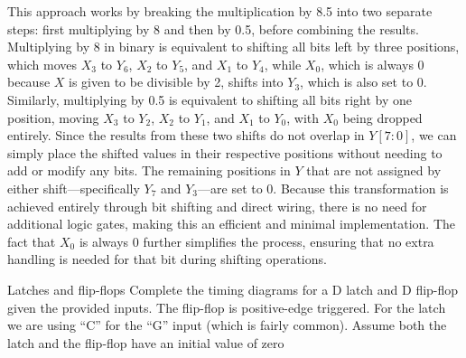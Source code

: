 \documentclass[12pt, letterpaper]{article}
\begin{document}
This approach works by breaking the multiplication by 8.5 into two separate steps: first multiplying by 8 and then by 0.5, before combining the results. 
Multiplying by 8 in binary is equivalent to shifting all bits left by three positions, which moves \( X_3 \) to \( Y_6 \), \( X_2 \) to \( Y_5 \), and \( X_1 \) to \( Y_4 \), while \( X_0 \), which is always 0 because \( X \) is given to be divisible by 2, shifts into \( Y_3 \), which is also set to 0. Similarly, multiplying by 0.5 is equivalent to shifting all bits right by one position, moving \( X_3 \) to \( Y_2 \), \( X_2 \) to \( Y_1 \), and \( X_1 \) to \( Y_0 \), with \( X_0 \) being dropped entirely. 
Since the results from these two shifts do not overlap in \( Y[7:0] \), we can simply place the shifted values in their respective positions without needing to add or modify any bits. 
The remaining positions in \( Y \) that are not assigned by either shift—specifically \( Y_7 \) and \( Y_3 \)—are set to 0. 
Because this transformation is achieved entirely through bit shifting and direct wiring, there is no need for additional logic gates, making this an efficient and minimal implementation. 
The fact that \( X_0 \) is always 0 further simplifies the process, ensuring that no extra handling is needed for that bit during shifting operations.

\begin{problem}{Latches and flip-flops}
    Complete the timing diagrams for a D latch and D flip-flop given the provided inputs. 
    The flip-flop is positive-edge triggered. For the latch we are using “C” for the “G” input (which is fairly common).
    Assume both the latch and the flip-flop have an initial value of zero
\end{problem}
\begin{center}
\end{center}
\end{document}
